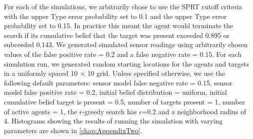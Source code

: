 \par For each of the simulations, we arbitrarily chose to use the SPRT cutoff criteria with the upper Type  error probability set to 0.1 and the upper Type  error probability set to 0.15. In practice this meant the agent would terminate the search if its cumulative belief that the target was present exceeded 0.895 or subceeded 0.143. We generated simulated sensor readings using arbitrarily chosen values of the false positive rate = 0.2 and a false negative rate = 0.15. For each simulation run, we generated random starting locations for the agents and targets in a uniformly spaced 10 $\times$ 10 grid. Unless specified otherwise, we use the following default parameters: sensor model false negative rate = 0.15, sensor model false positive rate = 0.2, initial belief distribution = uniform, initial cumulative belief target is present = 0.5, number of targets present = 1, number of active agents = 1, the $\epsilon$-greedy search has $\epsilon$=0.2 and a neighborhood radius of 4. Histograms showing the results of running the simulation with varying parameters are shown in \ref{chap:AppendixTwo}.





